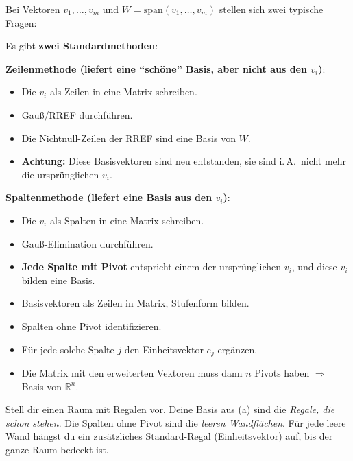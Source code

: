 \documentclass[a4paper,12pt]{article}
\begin{document}
Bei Vektoren $v_1, \dots, v_m$ und $W = \text{span}(v_1, \dots, v_m)$ stellen sich zwei typische Fragen:

\begin{merkbox}[title={Frage 1: Basis von $W$ finden}]
Es gibt \textbf{zwei Standardmethoden}:

\medskip
\textbf{Zeilenmethode (liefert eine ``sch\"one'' Basis, aber nicht aus den $v_i$)}:
\begin{itemize}[nosep]
    \item Die $v_i$ als Zeilen in eine Matrix schreiben.
    \item Gau\ss/RREF durchf\"uhren.
    \item Die Nichtnull-Zeilen der RREF sind eine Basis von $W$.
    \item \textbf{Achtung:} Diese Basisvektoren sind neu entstanden, sie sind i.\,A.\ nicht mehr die urspr\"unglichen $v_i$.
\end{itemize}

\medskip
\textbf{Spaltenmethode (liefert eine Basis \textbf{aus} den $v_i$)}:
\begin{itemize}[nosep]
    \item Die $v_i$ als Spalten in eine Matrix schreiben.
    \item Gau\ss-Elimination durchf\"uhren.
    \item \textbf{Jede Spalte mit Pivot} entspricht einem der urspr\"unglichen $v_i$, und diese $v_i$ bilden eine Basis.
\end{itemize}
\end{merkbox}

\begin{merkbox}[title={Frage 2: Basis auf $\mathbb{R}^n$ erweitern}]
\begin{itemize}[nosep]
    \item Basisvektoren als Zeilen in Matrix, Stufenform bilden.
    \item Spalten ohne Pivot identifizieren.
    \item F\"ur jede solche Spalte $j$ den Einheitsvektor $e_j$ erg\"anzen.
    \item Die Matrix mit den erweiterten Vektoren muss dann $n$ Pivots haben $\Rightarrow$ Basis von $\mathbb{R}^n$.
\end{itemize}
\end{merkbox}

\begin{analogie}
Stell dir einen Raum mit Regalen vor. Deine Basis aus (a) sind die \emph{Regale, die schon stehen}. Die Spalten ohne Pivot sind die \emph{leeren Wandfl\"achen}. F\"ur jede leere Wand h\"angst du ein zus\"atzliches Standard-Regal (Einheitsvektor) auf, bis der ganze Raum bedeckt ist.
\end{analogie}
\end{document}

